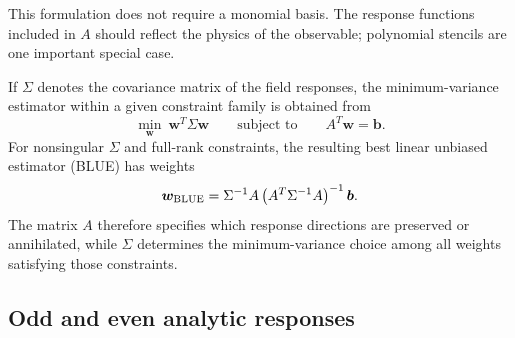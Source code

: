 \documentclass[aps,prd,preprint,nofootinbib,floatfix]{revtex4-2}
\begin{document}
This formulation does not require a monomial basis. The response
functions included in $A$ should reflect the physics of the observable;
polynomial stencils are one important special case.

If $\Sigma$ denotes the covariance matrix of the field responses, the
minimum-variance estimator within a given constraint family is obtained
from
\begin{equation}
\min_{\bm w}\ \bm w^T\Sigma\bm w
\qquad\text{subject to}\qquad
A^T\bm w=\bm b.
\label{eq:constrained_minimization}
\end{equation}
For nonsingular $\Sigma$ and full-rank constraints, the resulting best
linear unbiased estimator (BLUE) has weights
\begin{equation}
\bm w_{\rm BLUE}
=
\Sigma^{-1}A
\left(A^T\Sigma^{-1}A\right)^{-1}\bm b.
\label{eq:blueweights}
\end{equation}
The matrix $A$ therefore specifies which response directions are
preserved or annihilated, while $\Sigma$ determines the
minimum-variance choice among all weights satisfying those constraints.


\subsection{Odd and even analytic responses}
\end{document}
